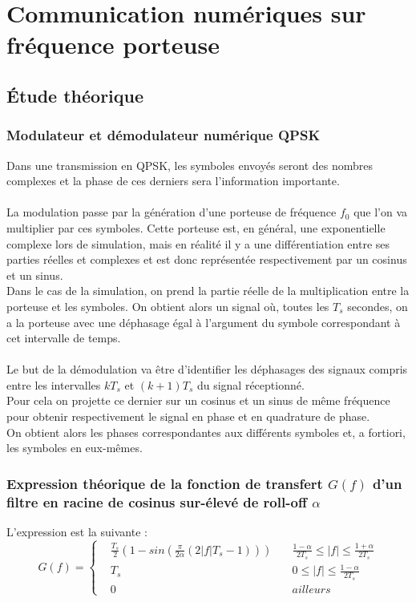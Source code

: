 \documentclass[11pt]{article}
\begin{document}
\section{Communication numériques sur fréquence porteuse}
	\subsection{Étude théorique}
		\subsubsection{Modulateur et démodulateur numérique QPSK}
			Dans une transmission en QPSK, les symboles envoyés seront des nombres complexes et la phase de ces derniers sera l'information importante.\\\\
			La modulation passe par la génération d'une porteuse de fréquence $f_0$ que l'on va multiplier par ces symboles. Cette porteuse est, en général, une exponentielle complexe lors de simulation, mais en réalité il y a une différentiation entre ses parties réelles et complexes et est donc représentée respectivement par un cosinus et un sinus.\\
			Dans le cas de la simulation, on prend la partie réelle de la multiplication entre la porteuse et les symboles. On obtient alors un signal où, toutes les $T_s$ secondes, on a la porteuse avec une déphasage égal à l'argument du symbole correspondant à cet intervalle de temps.\\\\
			Le but de la démodulation va être d'identifier les déphasages des signaux compris entre les intervalles $kT_s$ et $(k+1)T_s$ du signal réceptionné.\\
			Pour cela on projette ce dernier sur un cosinus et un sinus de même fréquence pour obtenir respectivement le signal en phase et en quadrature de phase.\\
			On obtient alors les phases correspondantes aux différents symboles et, a fortiori, les symboles en eux-mêmes.
			
		\subsubsection{Expression théorique de la fonction de transfert $G(f)$ d'un filtre en racine de cosinus sur-élevé de roll-off $\alpha$}
			L'expression est la suivante :
				\begin{equation}
					G(f) = 
					\left\{
							\begin{aligned}
								&\frac{T_s}{2}(1-sin(\frac{\pi}{2\alpha}(2\lvert f \rvert T_s - 1)))&\,\,\,\,\,\, \frac{1-\alpha}{2T_s} \le \lvert f \rvert \le \frac{1+\alpha}{2T_s}\\
								&T_s&\,\,\,\,\,\, 0 \le \lvert f \rvert \le \frac{1-\alpha}{2T_s} \\
								&0&\,\,\,\,\,\, ailleurs
								\end{aligned}
						\right.
				\end{equation}
			
\end{document}
